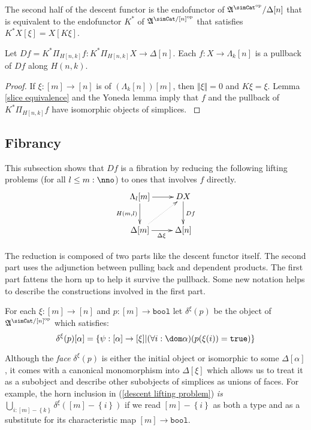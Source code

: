 \documentclass{tac}
\newcommand\set[1]{\left\{#1\right\}}
\newcommand\ri{^*}
\newcommand\dual{^{\mathrm{op}}}
\newcommand\s{^{\simCat\dual}}
\newcommand\of{:}
\newcommand\simplex\Delta
\newcommand\horn\Lambda
\newcommand\true{\mathtt{true}}
\newcommand\bool{\mathtt{bool}}
\newcommand\norm[1]{\Vert #1 \Vert}
\newcommand\depprod{\Pi_}
\newcommand\face\delta
\newcommand\ambient{\mathfrak A}
\begin{document}
The second half of the descent functor is the endofunctor of $\ambient\s/\simplex[n]$ that is equivalent to the endofunctor $K\ri$ of $\ambient^{\simCat/[n]\dual}$ that satisfies $K\ri X[\xi] = X[K\xi]$.

\begin{lemma} Let $Df = K\ri\depprod{H[n,k]}f\of K\ri\depprod{H[n,k]}X\to\simplex[n]$. Each $f\of X\to\horn_k[n]$ is a pullback of $Df$ along $H(n,k)$. \end{lemma}

\begin{proof} If $\xi\of [m]\to[n]$ is of $(\horn_k[n])[m]$, then $\norm\xi=0$ and $K\xi = \xi$. Lemma \ref{slice equivalence} and the Yoneda lemma imply that $f$ and the pullback of $K\ri\depprod{H[n,k]}f$ have isomorphic objects of simplices. \label{descent pullback}
\end{proof}

\subsection{Fibrancy}
This subsection shows that $Df$ is a fibration by reducing the following lifting problems (for all $l\leq m\of\nno$) to ones that involves $f$ directly.
\begin{equation}
	\xymatrix{
		\horn_l[m]\ar[r]\ar[d]_{H(m,l)} & DX\ar[d]^{Df} \\
		\simplex[m]\ar[r]_{\Delta\xi} \ar@{.>}[ur] & \simplex[n]
	}
	\label{descent lifting problem}
\end{equation}

The reduction is composed of two parts like the descent functor itself. The second part uses the adjunction between pulling back and dependent products. The first part fattens the horn up to help it survive the pullback. Some new notation helps to describe the constructions involved in the first part.


\begin{definition} For each $\xi\of[m]\to[n]$ and $p\of[m]\to\bool$ let $\face^\xi(p)$ be the object of $\ambient^{\simCat/[n]\dual}$ which satisfies: 
\[ \face^\xi(p)[\alpha] = \set{\psi\of [\alpha]\to[\xi] | (\forall i\of \dom\alpha)(p(\xi(i))=\true)} \]
\end{definition}

Although the \emph{face} $\face^\xi(p)$ is either the initial object or isomorphic to some $\simplex[\alpha]$, it comes with a canonical monomorphism into $\simplex[\xi]$ which allows us to treat it as a subobject and describe other subobjects of simplices as unions of faces. For example, the horn inclusion in (\ref{descent lifting problem}) \emph{is} $\bigcup_{i\of [m]-\set k} \face^\xi([m]-\set i)$ if we read $[m]-\set i$ as both a type and as a substitute for its characteristic map $[m]\to\bool$.
\end{document}
